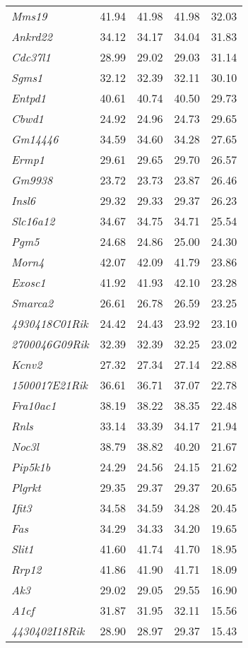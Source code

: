 \documentclass[oneside]{book}
\begin{document}
\begin{table}[ht]
\begin{tabular}{>{\em}lrrrr}
  Mms19 & 41.94 & 41.98 & 41.98 & 32.03 \\
  Ankrd22 & 34.12 & 34.17 & 34.04 & 31.83 \\
  Cdc37l1 & 28.99 & 29.02 & 29.03 & 31.14 \\
  Sgms1 & 32.12 & 32.39 & 32.11 & 30.10 \\
  Entpd1 & 40.61 & 40.74 & 40.50 & 29.73 \\
  Cbwd1 & 24.92 & 24.96 & 24.73 & 29.65 \\
  Gm14446 & 34.59 & 34.60 & 34.28 & 27.65 \\
  Ermp1 & 29.61 & 29.65 & 29.70 & 26.57 \\
  Gm9938 & 23.72 & 23.73 & 23.87 & 26.46 \\
  Insl6 & 29.32 & 29.33 & 29.37 & 26.23 \\
  Slc16a12 & 34.67 & 34.75 & 34.71 & 25.54 \\
  Pgm5 & 24.68 & 24.86 & 25.00 & 24.30 \\
  Morn4 & 42.07 & 42.09 & 41.79 & 23.86 \\
  Exosc1 & 41.92 & 41.93 & 42.10 & 23.28 \\
  Smarca2 & 26.61 & 26.78 & 26.59 & 23.25 \\
  4930418C01Rik & 24.42 & 24.43 & 23.92 & 23.10 \\
  2700046G09Rik & 32.39 & 32.39 & 32.25 & 23.02 \\
  Kcnv2 & 27.32 & 27.34 & 27.14 & 22.88 \\
  1500017E21Rik & 36.61 & 36.71 & 37.07 & 22.78 \\
  Fra10ac1 & 38.19 & 38.22 & 38.35 & 22.48 \\
  Rnls & 33.14 & 33.39 & 34.17 & 21.94 \\
  Noc3l & 38.79 & 38.82 & 40.20 & 21.67 \\
  Pip5k1b & 24.29 & 24.56 & 24.15 & 21.62 \\
  Plgrkt & 29.35 & 29.37 & 29.37 & 20.65 \\
  Ifit3 & 34.58 & 34.59 & 34.28 & 20.45 \\
  Fas & 34.29 & 34.33 & 34.20 & 19.65 \\
  Slit1 & 41.60 & 41.74 & 41.70 & 18.95 \\
  Rrp12 & 41.86 & 41.90 & 41.71 & 18.09 \\
  Ak3 & 29.02 & 29.05 & 29.55 & 16.90 \\
  A1cf & 31.87 & 31.95 & 32.11 & 15.56 \\
  4430402I18Rik & 28.90 & 28.97 & 29.37 & 15.43 \\

\end{tabular}
\end{table}
\end{document}
